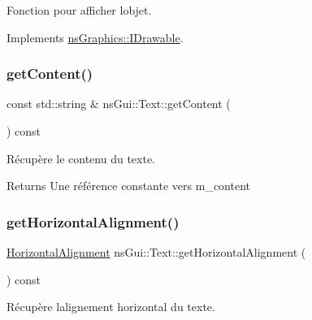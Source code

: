 Fonction pour afficher l\textquotesingle{}objet. 



Implements \hyperlink{classns_graphics_1_1_i_drawable_abed8a61e1d507d31e76f0891f3bf9c51}{ns\+Graphics\+::\+I\+Drawable}.

\mbox{\label{classns_gui_1_1_text_adea76711a628669e54020b282152e389}} 
\subsubsection{\texorpdfstring{get\+Content()}{getContent()}}
{\footnotesize\ttfamily const std\+::string \& ns\+Gui\+::\+Text\+::get\+Content (\begin{DoxyParamCaption}{ }\end{DoxyParamCaption}) const}



Récupère le contenu du texte. 

\begin{DoxyReturn}{Returns}
Une référence constante vers m\+\_\+content 
\end{DoxyReturn}
\mbox{\label{classns_gui_1_1_text_a2e3468bf7a3b43e5e87a68ed7876dcfe}} 
\subsubsection{\texorpdfstring{get\+Horizontal\+Alignment()}{getHorizontalAlignment()}}
{\footnotesize\ttfamily \hyperlink{classns_gui_1_1_text_a78bb37c174a4f37eec2b7d69459ee7dc}{Horizontal\+Alignment} ns\+Gui\+::\+Text\+::get\+Horizontal\+Alignment (\begin{DoxyParamCaption}{ }\end{DoxyParamCaption}) const}



Récupère l\textquotesingle{}alignement horizontal du texte. 

\mbox{\label{classns_gui_1_1_text_a1e06796a15191e7682eb4abd0ecc515e}} 

